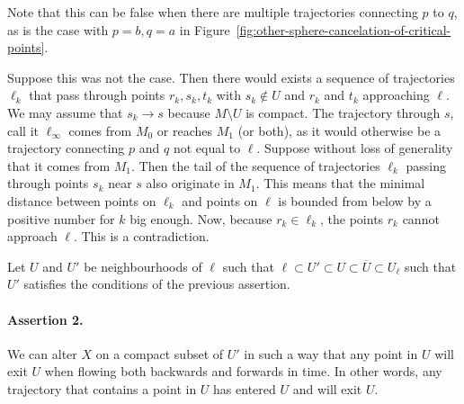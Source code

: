 \begin{myproof}
Note that this can be false when there are multiple trajectories connecting $p$ to $q$, as is the case with $p = b, q = a$ in Figure~\ref{fig:other-sphere-cancelation-of-critical-points}.
\begin{myproof}
    Suppose this was not the case.
    Then there would exists a sequence of trajectories $\ell_k$ that pass through points $r_k, s_k, t_k$ with $s_k \not\in U$ and $r_k$ and $t_k$ approaching $\ell$.
    We may assume that $s_k \to s$ because $M \setminus U$ is compact.
    The trajectory through $s$, call it $ \ell_\infty$ comes from  $ M_0$ or reaches $ M_1$ (or both), as it would otherwise be a trajectory connecting $p$ and $q$ not equal to $\ell$.
    Suppose without loss of generality that it comes from $M_1$.
    Then the tail of the sequence of trajectories $\ell_{k}$ passing through points $s_k$ near $s$ also originate in $M_1$.
    This means that the minimal distance between points on $\ell_{k}$ and points on $\ell$ is bounded from below by a positive number for $k$ big enough.
    Now, because $r_k \in \ell_k$, the points $r_k$ cannot approach  $\ell$. This is a contradiction.
\end{myproof}

Let $U$ and $U'$ be neighbourhoods of $\ell$ such that $\ell \subset U' \subset U \subset \overline{U} \subset U_\ell$ such that $U'$ satisfies the conditions of the previous assertion.

\paragraph{Assertion 2.}
We can alter $X$ on a compact subset of $U'$ in such a way that any point in $U$ will exit $U$ when flowing both backwards and forwards in time.
In other words, any trajectory that contains a point in $U$ has entered $U$  and will exit $U$.


\end{myproof}
